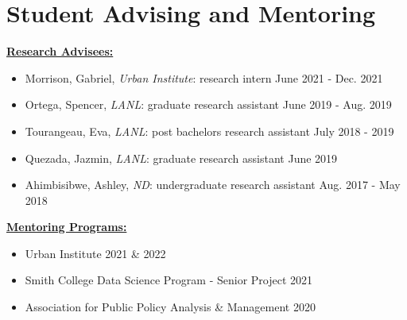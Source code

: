 \documentclass[11pt, letterpaper, roman]{moderncv} %
\begin{document}
\newpage
\section{Student Advising and Mentoring}

\underline{\textbf{\large Research Advisees:}}\normalsize

    \begin{itemize}
        \item Morrison, Gabriel, \textit{Urban Institute}: research intern \hfill June 2021 - Dec. 2021
        \item Ortega, Spencer, \textit{LANL}: graduate research assistant \hfill June 2019 - Aug. 2019
        \item Tourangeau, Eva, \textit{LANL}: post bachelors research assistant \hfill July 2018 - 2019
        \item Quezada, Jazmin, \textit{LANL}: graduate research assistant \hfill June 2019
        \item Ahimbisibwe, Ashley, \textit{ND}: undergraduate research assistant \hfill Aug. 2017 - May 2018
    \end{itemize}

\vspace{6pt}
\underline{\textbf{\large Mentoring Programs:}}\normalsize

    \begin{itemize}
        \item Urban Institute \hfill 2021 \& 2022
        \item Smith College Data Science Program - Senior Project \hfill 2021
        \item Association for Public Policy Analysis \& Management \hfill 2020
    \end{itemize}
\end{document}
